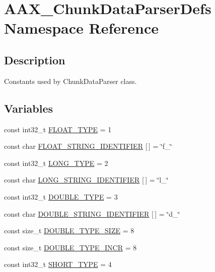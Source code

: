 \hypertarget{a00321}{}\section{A\+A\+X\+\_\+\+Chunk\+Data\+Parser\+Defs Namespace Reference}
\label{a00321}


\subsection{Description}
Constants used by Chunk\+Data\+Parser class. \subsection*{Variables}
\begin{DoxyCompactItemize}
\item 
const int32\+\_\+t \hyperlink{a00321_ad5dab97f040a4e216054bec18a3a3848}{F\+L\+O\+A\+T\+\_\+\+T\+Y\+P\+E} = 1
\item 
const char \hyperlink{a00321_a8340a22e9392091da5acf3bbbea18fc6}{F\+L\+O\+A\+T\+\_\+\+S\+T\+R\+I\+N\+G\+\_\+\+I\+D\+E\+N\+T\+I\+F\+I\+E\+R} \mbox{[}$\,$\mbox{]} = \char`\"{}f\+\_\+\char`\"{}
\item 
const int32\+\_\+t \hyperlink{a00321_a228099aae2d4442465b8d8ba67d832c7}{L\+O\+N\+G\+\_\+\+T\+Y\+P\+E} = 2
\item 
const char \hyperlink{a00321_af53f70a76b16ae3e06cd38515f3842e1}{L\+O\+N\+G\+\_\+\+S\+T\+R\+I\+N\+G\+\_\+\+I\+D\+E\+N\+T\+I\+F\+I\+E\+R} \mbox{[}$\,$\mbox{]} = \char`\"{}l\+\_\+\char`\"{}
\item 
const int32\+\_\+t \hyperlink{a00321_a4724cff14c9b5d97bf3304247c717763}{D\+O\+U\+B\+L\+E\+\_\+\+T\+Y\+P\+E} = 3
\item 
const char \hyperlink{a00321_a9875551b1fa5760f6b6d4525d62d7ccc}{D\+O\+U\+B\+L\+E\+\_\+\+S\+T\+R\+I\+N\+G\+\_\+\+I\+D\+E\+N\+T\+I\+F\+I\+E\+R} \mbox{[}$\,$\mbox{]} = \char`\"{}d\+\_\+\char`\"{}
\item 
const size\+\_\+t \hyperlink{a00321_a485cccfc704f0da8c1d25aa0ba5723ab}{D\+O\+U\+B\+L\+E\+\_\+\+T\+Y\+P\+E\+\_\+\+S\+I\+Z\+E} = 8
\item 
const size\+\_\+t \hyperlink{a00321_aaa27d90baca7ee4caaeab126c56ff76f}{D\+O\+U\+B\+L\+E\+\_\+\+T\+Y\+P\+E\+\_\+\+I\+N\+C\+R} = 8
\item 
const int32\+\_\+t \hyperlink{a00321_a4e1dca1df2ca60f4325cddbbc7556121}{S\+H\+O\+R\+T\+\_\+\+T\+Y\+P\+E} = 4
\item 

\end{DoxyCompactItemize}
